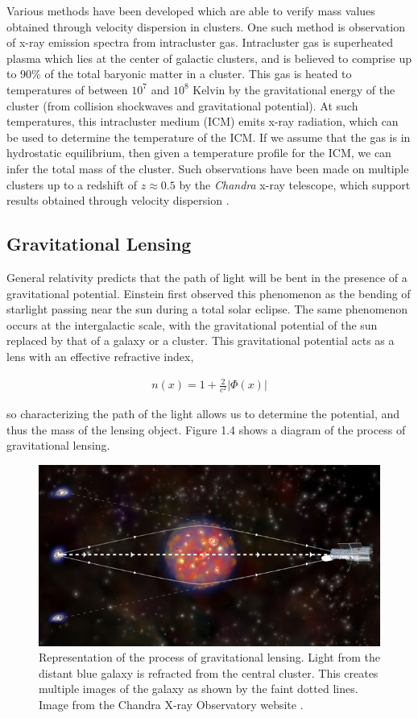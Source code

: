 \documentclass{report}
\begin{document}
Various methods have been developed which are able to verify mass values obtained through velocity dispersion in clusters. One such method is observation of x-ray emission spectra from intracluster gas. Intracluster gas is superheated plasma which lies at the center of galactic clusters, and is believed to comprise up to 90\% of the total baryonic matter in a cluster. This gas is heated to temperatures of between $10^7$ and $10^8$ Kelvin by the gravitational energy of the cluster (from collision shockwaves and gravitational potential). At such temperatures, this intracluster medium (ICM) emits x-ray radiation, which can be used to determine the temperature of the ICM. If we assume that the gas is in hydrostatic equilibrium, then given a temperature profile for the ICM, we can infer the total mass of the cluster. Such observations have been made on multiple clusters up to a redshift of $z \approx 0.5$ by the \emph{Chandra} x-ray telescope, which support results obtained through velocity dispersion \cite{Vikhlinin2005,Vikhlinin2009}.

\subsection{Gravitational Lensing}

General relativity predicts that the path of light will be bent in the presence of a gravitational potential. Einstein first observed this phenomenon as the bending of starlight passing near the sun during a total solar eclipse. The same phenomenon occurs at the intergalactic scale, with the gravitational potential of the sun replaced by that of a galaxy or a cluster. This gravitational potential acts as a lens with an effective refractive index,

\begin{eqnarray}
n(x) = 1 + \frac{2}{c^2}|\Phi(x)|
\end{eqnarray}

so characterizing the path of the light allows us to determine the potential, and thus the mass of the lensing object. Figure 1.4 shows a diagram of the process of gravitational lensing.

\begin{figure}[h]
\centering
\includegraphics[width = .4\textwidth]{Lens_diagram.jpg}
\caption{Representation of the process of gravitational lensing. Light from the distant blue galaxy is refracted from the central cluster. This creates multiple images of the galaxy as shown by the faint dotted lines. Image from the Chandra X-ray Observatory website \cite{lens}.}
\end{figure}
\end{document}
